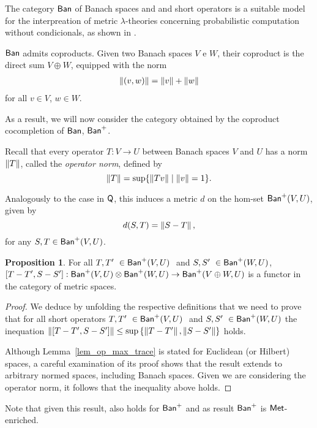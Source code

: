 \documentclass[10pt,a4paper]{amsart}
\theoremstyle{definition}
\theoremstyle{definition}
\theoremstyle{definition}
\theoremstyle{definition}
\newtheorem{proposition}[definition]{Proposition}
\theoremstyle{definition}
\theoremstyle{definition}
\begin{document}
  The category $\mathsf{Ban}$ of Banach spaces and and short operators is a suitable model for the interpreation of metric $\lambda$-theories
  concerning probabilistic computation without condicionals, as shown in \cite{dahlqvist2023syntactic}. 
  
  
  $\mathsf{Ban}$ admits coproducts. Given two Banach spaces  $V$ e $W$, their coproduct is the direct sum $V \oplus W$, equipped with the norm
  \begin{align*}
    \left\lVert (v,w) \right\rVert = \left\lVert v \right\rVert+\left\lVert w \right\rVert
  \end{align*}
  for all  $v \in V$, $w \in W$.

  As a result, we will now consider the category obtained by the coproduct cocompletion of $\mathsf{Ban}$, $\mathsf{Ban}^+$.

  Recall that every operator \( T: V \to U \) between Banach spaces \( V \) and \( U \) has a norm \( \left\lVert T \right\rVert \), called the \emph{operator norm}, defined by
  \[
  \left\lVert T \right\rVert = \sup \{ \left\lVert Tv \right\rVert \mid \left\lVert v \right\rVert = 1 \}.
  \]
  
  Analogously to the case in \( \mathsf{Q} \), this induces a metric \( d \) on the hom-set \( \mathsf{Ban}^+(V, U) \), given by
  \[
  d(S, T) = \left\lVert S - T \right\rVert,
  \]
  for any \( S, T \in \mathsf{Ban}^+(V, U) \).

  \begin{proposition} \label{prop:met_cond_pp}
    For all $T, T' \in \catBan^+(V,U)  $ and $S, S' \in \catBan^+(W,U) $, $[T-T',S-S']:\mathsf{Ban}^+(V,U) \otimes \mathsf{Ban}^+(W,U) \rightarrow \mathsf{Ban}^+(V \oplus W,U) $ is a functor in the category of metric spaces.
  \end{proposition}

  \begin{proof}
    We deduce by unfolding the respective definitions that we need to prove that for all short operators $T, T' \in \catBan^+(V,U)  $ and $S, S' \in \catBan^+(W,U) $ the inequation $\left\lVert [T-T', S-S'] \right\rVert \leq  \sup \left\{ \left\lVert T-T' \right\rVert, \left\lVert S-S' \right\rVert \right\}$ holds.

    Although Lemma~\ref{lem_op_max_trace} is stated for Euclidean (or Hilbert) spaces, a careful examination of its proof shows that the result extends to arbitrary normed spaces, including Banach spaces. Given we are considering the operator norm,  it follows that the inequality above  holds.

  \end{proof}
  
  Note that given this result, \cite[Theorem 4.3]{dahlqvist2023syntactic} also holds for $\mathsf{Ban}^+$ and as result $\mathsf{Ban}^+$ is $\mathsf{Met}$-enriched.
\end{document}
